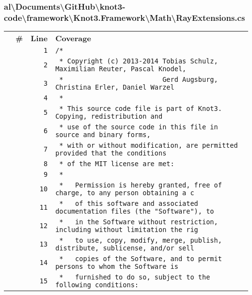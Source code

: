 \documentclass[a4paper,10pt]{article}
\begin{document}
\subsubsection{al\textbackslash Documents\textbackslash GitHub\textbackslash knot3-code\textbackslash framework\textbackslash Knot3.Framework\textbackslash Math\textbackslash RayExtensions.cs}
\begin{longtable}[l]{lrrl}
\textbf{} & \textbf{\#} & \textbf{Line} & \textbf{Coverage}\\
\cellcolor{gray} &  & \verb~1~ & \verb~/*~\\
\cellcolor{gray} &  & \verb~2~ & \verb~ * Copyright (c) 2013-2014 Tobias Schulz, Maximilian Reuter, Pascal Knodel,~\\
\cellcolor{gray} &  & \verb~3~ & \verb~ *                         Gerd Augsburg, Christina Erler, Daniel Warzel~\\
\cellcolor{gray} &  & \verb~4~ & \verb~ *~\\
\cellcolor{gray} &  & \verb~5~ & \verb~ * This source code file is part of Knot3. Copying, redistribution and~\\
\cellcolor{gray} &  & \verb~6~ & \verb~ * use of the source code in this file in source and binary forms,~\\
\cellcolor{gray} &  & \verb~7~ & \verb~ * with or without modification, are permitted provided that the conditions~\\
\cellcolor{gray} &  & \verb~8~ & \verb~ * of the MIT license are met:~\\
\cellcolor{gray} &  & \verb~9~ & \verb~ *~\\
\cellcolor{gray} &  & \verb~10~ & \verb~ *   Permission is hereby granted, free of charge, to any person obtaining a c~\\
\cellcolor{gray} &  & \verb~11~ & \verb~ *   of this software and associated documentation files (the "Software"), to ~\\
\cellcolor{gray} &  & \verb~12~ & \verb~ *   in the Software without restriction, including without limitation the rig~\\
\cellcolor{gray} &  & \verb~13~ & \verb~ *   to use, copy, modify, merge, publish, distribute, sublicense, and/or sell~\\
\cellcolor{gray} &  & \verb~14~ & \verb~ *   copies of the Software, and to permit persons to whom the Software is~\\
\cellcolor{gray} &  & \verb~15~ & \verb~ *   furnished to do so, subject to the following conditions:~\\

\end{longtable}
\end{document}
